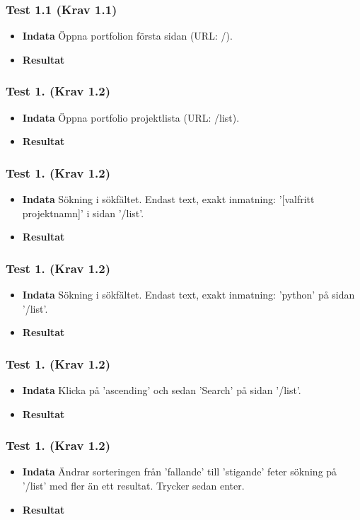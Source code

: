 \documentclass{TDP003mall}
\begin{document}
\subsubsection*{Test 1.1 (Krav 1.1)}
\begin{itemize}
\item[]\textbf{Indata} Öppna portfolion första sidan (URL: /).
\item[]\textbf{Resultat} 
\end{itemize}
\subsubsection*{Test 1. (Krav 1.2)}
\begin{itemize}
\item[]\textbf{Indata} Öppna portfolio projektlista (URL: /list).
\item[]\textbf{Resultat} 
\end{itemize}
\subsubsection*{Test 1. (Krav 1.2)}
\begin{itemize}
\item[]\textbf{Indata} Sökning i sökfältet. Endast text, exakt inmatning: '[valfritt projektnamn]' i sidan '/list'.
\item[]\textbf{Resultat} 
\end{itemize} 
\subsubsection*{Test 1. (Krav 1.2)}
\begin{itemize}
\item[]\textbf{Indata} Sökning i sökfältet. Endast text, exakt inmatning: 'python' på sidan '/list'.
\item[]\textbf{Resultat} 
\end{itemize}
\subsubsection*{Test 1. (Krav 1.2)}
\begin{itemize}
\item[]\textbf{Indata} Klicka på 'ascending' och sedan 'Search' på sidan '/list'.
\item[]\textbf{Resultat} 
\end{itemize}
\subsubsection*{Test 1. (Krav 1.2)}
\begin{itemize}
\item[]\textbf{Indata} Ändrar sorteringen från 'fallande' till 'stigande' feter sökning på '/list' med fler än ett resultat. Trycker sedan enter.
\item[]\textbf{Resultat} 
\end{itemize}
\end{document}
